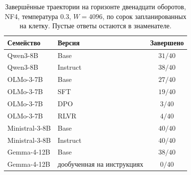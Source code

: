 \documentclass[10pt]{article}
\begin{document}
\begin{table}[t]
  \centering
  \caption{Завершённые траектории на горизонте двенадцати оборотов,
    NF4, температура $0.3$, $W{=}4096$, по сорок запланированных на клетку.
    Пустые ответы остаются в знаменателе.} %
  \label{tab:completion}
  \begin{tabular}{@{}llc@{}}
    \toprule
    Семейство & Версия & Завершено \\
    \midrule
    Qwen3-8B & Base & $31/40$ \\ %
    Qwen3-8B & Instruct & $38/40$ \\ %
    OLMo-3-7B & Base & $27/40$ \\ %
    OLMo-3-7B & SFT & $19/40$ \\ %
    OLMo-3-7B & DPO & $3/40$ \\ %
    OLMo-3-7B & RLVR & $4/40$ \\ %
    Ministral-3-8B & Base & $40/40$ \\ %
    Ministral-3-8B & Instruct & $40/40$ \\ %
    Gemma-4-12B & Base & $38/40$ \\ %
    Gemma-4-12B & дообученная на инструкциях & $0/40$ \\ %
    \bottomrule
  \end{tabular}
\end{table}
\end{document}
